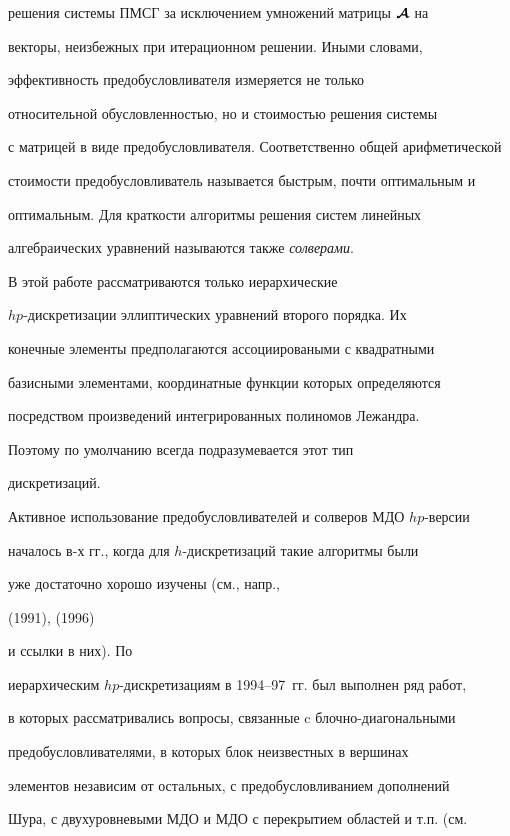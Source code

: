 решения системы ПМСГ за исключением умножений матрицы ${\boldsymbol{\cal {A}}}$ на


векторы, неизбежных при итерационном решении. Иными словами,


эффективность предобусловливателя измеряется не только


относительной обусловленностью, но и стоимостью решения системы


с матрицей в виде предобусловливателя. Соответственно общей арифметической 


стоимости предобусловливатель называется быстрым, почти оптимальным и


оптимальным. Для краткости алгоритмы решения систем линейных


алгебраических уравнений называются также {\em солверами}.


В этой работе рассматриваются только иерархические


$hp$-дискретизации эллиптических уравнений второго порядка. Их


конечные элементы предполагаются ассоциироваными с квадратными


базисными элементами, координатные функции которых определяются


посредством произведений интегрированных полиномов Лежандра.


Поэтому по умолчанию всегда подразумевается этот тип


дискретизаций.





Активное использование предобусловливателей и солверов МДО $hp$-версии 


началось в-х гг., когда для $h$-дискретизаций такие алгоритмы были


уже достаточно хорошо изучены (см., напр., 


\cite{Nepomnyaschikh:91} (1991), \cite{SmithBjorstadGropp:96} (1996)


и ссылки в них). По


иерархическим $hp$-дискретизациям в 1994--97~гг. был выполнен ряд работ, 


в которых рассматривались вопросы, связанные c блочно-диагональными 


предобусловливателями, в которых блок неизвестных в вершинах


элементов независим от остальных, с предобусловливанием дополнений 


Шура, с двухуровневыми МДО и МДО с перекрытием областей и т.п. (см. 


